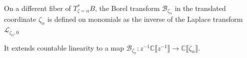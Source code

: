 \documentclass[pdftex]{sigma}
\newcommand{\maps}{\colon}
\newcommand{\C}{\mathbb{C}}
\newcommand{\laplace}{\mathcal{L}}
\newcommand{\borel}{\mathcal{B}}
\numberwithin{equation}{section}
\begin{document}
On a different fiber of $T_{\zeta=\alpha}^*B$, the Borel transform $\borel_{\zeta_\alpha}$ in the translated coordinate $\zeta_\alpha$ is defined on monomials as the inverse of the Laplace transform $\laplace_{\zeta_\alpha,0}$
\begin{center}
\end{center}
It extends countable linearity to a map $\borel_{\zeta_\alpha} \maps z^{-1} \C \big\llbracket z^{-1} \big\rrbracket \to \C \llbracket \zeta_\alpha \rrbracket$.
%
\end{document}
